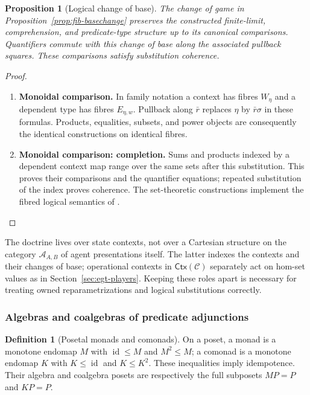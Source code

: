 \documentclass[11pt,a4paper]{article}
\numberwithin{equation}{section}
\newtheorem{proposition}[theorem]{Proposition}
\theoremstyle{definition}
\newtheorem{definition}[theorem]{Definition}
\theoremstyle{remark}
\theoremstyle{plain}
\begin{document}
\begin{proposition}[Logical change of base]
\label{prop:fib-logical-basechange}
The change of game in Proposition~\ref{prop:fib-basechange} preserves
the constructed finite-limit, comprehension, and predicate-type
structure up to its canonical comparisons. Quantifiers commute with
this change of base along the associated pullback squares. These
comparisons satisfy substitution coherence.
\end{proposition}
\begin{proof}
\leavevmode
\begin{enumerate}[label=\textup{(\arabic*)},leftmargin=*,itemsep=4pt,topsep=3pt]
  \item \textbf{Monoidal comparison.} In family notation a context has fibres $W_\eta$ and a dependent type
has fibres $E_{\eta,w}$. Pullback along $\bar r$ replaces $\eta$ by
$\bar r\sigma$ in these formulas. Products, equalities, subsets, and
power objects are consequently the identical constructions on identical
fibres.
  \item \textbf{Monoidal comparison: completion.} Sums and products indexed by a dependent context map range over
the same sets after this substitution. This proves their comparisons
and the quantifier equations; repeated substitution of the index proves
coherence. The set-theoretic constructions implement the fibred logical
semantics of \citet{Jacobs1999}.
\end{enumerate}
\end{proof}

The doctrine lives over state contexts, not over a Cartesian structure
on the category $\mathcal A_{A,B}$ of agent presentations itself. The latter indexes the
contexts and their changes of base; operational contexts in $\mathsf{Ctx}(\mathcal C)$ separately act
on hom-set values as in Section~\ref{sec:egt-players}. Keeping these roles
apart is necessary for treating owned reparametrizations and logical
substitutions correctly.

\subsubsection{Algebras and coalgebras of predicate adjunctions}

\begin{definition}[Posetal monads and comonads]
\label{def:egt-posetal-monads-and-comonads}
On a poset, a monad is a monotone endomap $M$ with
$\operatorname{id}\leq M$ and $M^2\leq M$; a comonad is a monotone
endomap $K$ with $K\leq\operatorname{id}$ and $K\leq K^2$.
These inequalities imply idempotence. Their algebra and coalgebra posets
are respectively the full subposets $MP=P$ and $KP=P$.
\end{definition}
\end{document}
